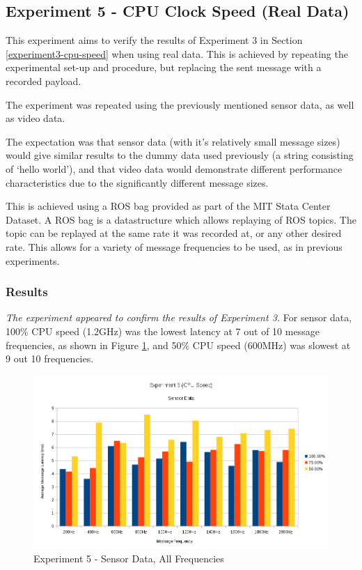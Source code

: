 \documentclass[../dissertation.tex]{subfiles}
\begin{document}
\subsection{Experiment 5 - CPU Clock Speed (Real Data)}

This experiment aims to verify the results of Experiment 3 in Section \ref{experiment3-cpu-speed} when using real data. This is achieved by repeating the experimental set-up and procedure, but replacing the sent message with a recorded payload.

The experiment was repeated using the previously mentioned sensor data, as well as video data.

The expectation was that sensor data (with it's relatively small message sizes) would give similar results to the dummy data used previously (a string consisting of `hello world'), and that video data would demonstrate different performance characteristics due to the significantly different message sizes.

This is achieved using a ROS bag provided as part of the MIT Stata Center Dataset. A ROS bag is a datastructure which allows replaying of ROS topics. The topic can be replayed at the same rate it was recorded at, or any other desired rate. This allows for a variety of message frequencies to be used, as in previous experiments.

\subsubsection{Results}

\textit{The experiment appeared to confirm the results of Experiment 3.} For sensor data, 100\% CPU speed (1.2GHz) was the lowest latency at 7 out of 10 message frequencies, as shown in Figure \ref{exp5-sensor-means-all-freq}, and 50\% CPU speed (600MHz) was slowest at 9 out 10 frequencies.

\begin{figure}[H]
\centering
\includegraphics[width=\textwidth]{images/experiment5/sensor_data_all_freqs.png}
\caption{Experiment 5 - Sensor Data, All Frequencies}
\label{exp5-sensor-means-all-freq}
\end{figure}
\end{document}
